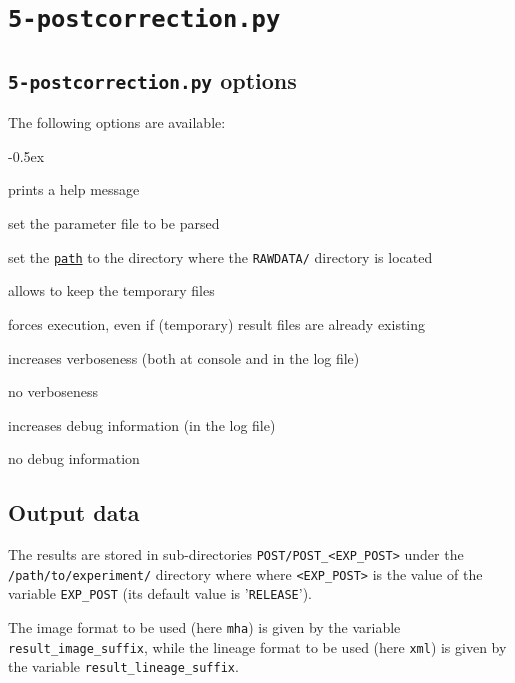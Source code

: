 \section{\texttt{5-postcorrection.py}}
\label{sec:cli:post:correction}

\subsection{\texttt{5-postcorrection.py} options}

The following options are available:
\begin{description}
  \itemsep -0.5ex
\item[\texttt{-h}] prints a help message
\item[\texttt{-p \underline{file}}] set the parameter file to be parsed
\item[\texttt{-e \underline{path}}] set the
  \texttt{\underline{path}} to the directory where the
  \texttt{RAWDATA/} directory is located
\item[\texttt{-k}] allows to keep the temporary files
\item[\texttt{-f}] forces execution, even if (temporary) result files
  are already existing
\item[\texttt{-v}] increases verboseness (both at console and in the
  log file)
\item[\texttt{-nv}] no verboseness
\item[\texttt{-d}]  increases debug information (in the
  log file)
\item[\texttt{-nd}] no debug information
\end{description}

\subsection{Output data}

The results are stored in sub-directories
\texttt{POST/POST\_<EXP\_POST>} under the
\texttt{/path/to/experiment/} directory where where \texttt{<EXP\_POST>} is the value of the variable \texttt{EXP\_POST} (its
default value is '\texttt{RELEASE}'). 


The image format to be used (here \verb|mha|) is given by the variable \texttt{result\_image\_suffix}, while the lineage format to be used (here \verb|xml|) is given by the variable \texttt{result\_lineage\_suffix}.

